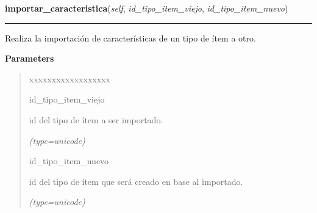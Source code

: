 \hspace{.8\funcindent}\begin{boxedminipage}{\funcwidth}

    \raggedright \textbf{importar\_caracteristica}(\textit{self}, \textit{id\_tipo\_item\_viejo}, \textit{id\_tipo\_item\_nuevo})

    \vspace{-1.5ex}

    \rule{\textwidth}{0.5\fboxrule}
\setlength{\parskip}{2ex}
    Realiza la importación de características de un tipo de ítem a otro.

\setlength{\parskip}{1ex}
      \textbf{Parameters}
      \vspace{-1ex}

      \begin{quote}
        \begin{Ventry}{xxxxxxxxxxxxxxxxxx}

          \item[id\_tipo\_item\_viejo]

          id del tipo de ítem a ser importado.

            {\it (type=unicode)}

          \item[id\_tipo\_item\_nuevo]

          id del tipo de ítem que será creado en base al importado.

            {\it (type=unicode)}

        \end{Ventry}

      \end{quote}

    \end{boxedminipage}

    \label{saip:controllers:fase_controller_2:FaseControllerNuevo:importar_tipo_item}

    \vspace{0.5ex}

